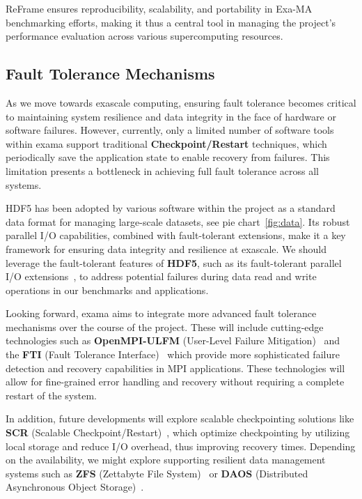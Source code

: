 ReFrame ensures reproducibility, scalability, and portability in Exa-MA benchmarking efforts, making it thus a central tool in managing the project's performance evaluation across various supercomputing resources.

\subsection{Fault Tolerance Mechanisms}
\label{sec:fault-tolerance}

As we move towards exascale computing, ensuring fault tolerance becomes critical to maintaining system resilience and data integrity in the face of hardware or software failures. However, currently, only a limited number of software tools within \ac{exama} support traditional \textbf{Checkpoint/Restart} techniques, which periodically save the application state to enable recovery from failures. This limitation presents a bottleneck in achieving full fault tolerance across all systems. 

HDF5 has been adopted by various software within the \exama project as a standard data format for managing large-scale datasets, see pie chart~\ref{fig:data}. Its robust parallel I/O capabilities, combined with fault-tolerant extensions, make it a key framework for ensuring data integrity and resilience at exascale. We should leverage the fault-tolerant features of \textbf{HDF5}, such as its fault-tolerant parallel I/O extensions~\cite{koziol_extreme_2012}, to address potential failures during data read and write operations in our benchmarks and applications.

Looking forward, \ac{exama} aims to integrate more advanced fault tolerance mechanisms over the course of the project. These will include cutting-edge technologies such as \textbf{OpenMPI-ULFM} (User-Level Failure Mitigation)~\cite{open_mpi_documentation_team_user_2024,fault_tolerance_working_group_mpi_forum_user_2024} and the \textbf{FTI} (Fault Tolerance Interface)~\cite{bautista-gomez_fti_2011,fti_documentation_team_fti_2024} which provide more sophisticated failure detection and recovery capabilities in MPI applications. These technologies will allow for fine-grained error handling and recovery without requiring a complete restart of the system.


In addition, future developments will explore scalable checkpointing solutions like \textbf{SCR} (Scalable Checkpoint/Restart)~\cite{laboratory_llnl_scalable_2024}, which optimize checkpointing by utilizing local storage and reduce I/O overhead, thus improving recovery times. Depending on the availability, we might explore supporting resilient data management systems such as \textbf{ZFS} (Zettabyte File System)~\cite{project_zfs_2024} or \textbf{DAOS} (Distributed Asynchronous Object Storage)~\cite{liang_daos_2020}.



